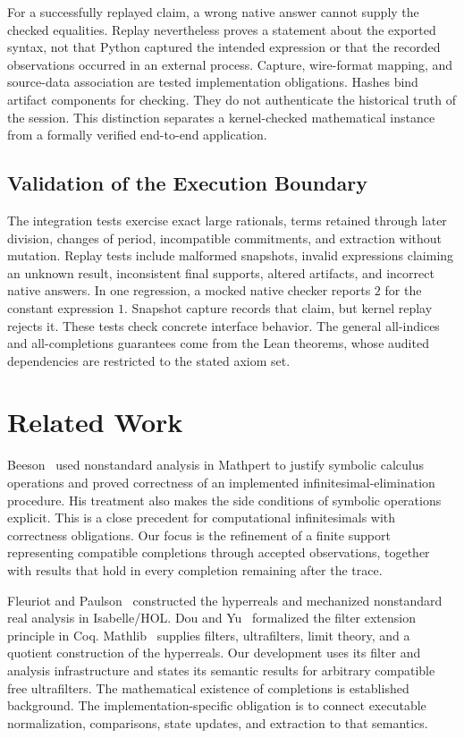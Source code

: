 \documentclass[11pt,a4paper]{article}
\theoremstyle{result}
\theoremstyle{definition}
\begin{document}
For a successfully replayed claim, a wrong native answer cannot supply the checked equalities. Replay nevertheless proves a statement about the exported syntax, not that Python captured the intended expression or that the recorded observations occurred in an external process. Capture, wire-format mapping, and source-data association are tested implementation obligations. Hashes bind artifact components for checking. They do not authenticate the historical truth of the session. This distinction separates a kernel-checked mathematical instance from a formally verified end-to-end application.

\subsection{Validation of the Execution Boundary}

The integration tests exercise exact large rationals, terms retained through later division, changes of period, incompatible commitments, and extraction without mutation. Replay tests include malformed snapshots, invalid expressions claiming an unknown result, inconsistent final supports, altered artifacts, and incorrect native answers. In one regression, a mocked native checker reports $2$ for the constant expression $1$. Snapshot capture records that claim, but kernel replay rejects it. These tests check concrete interface behavior. The general all-indices and all-completions guarantees come from the Lean theorems, whose audited dependencies are restricted to the stated axiom set.

\section{Related Work}\label{sec:related}

Beeson~\cite{Beeson1995} used nonstandard analysis in Mathpert to justify symbolic calculus operations and proved correctness of an implemented infinitesimal-elimination procedure. His treatment also makes the side conditions of symbolic operations explicit. This is a close precedent for computational infinitesimals with correctness obligations. Our focus is the refinement of a finite support representing compatible completions through accepted observations, together with results that hold in every completion remaining after the trace.

Fleuriot and Paulson~\cite{FleuriotPaulson2000} constructed the hyperreals and mechanized nonstandard real analysis in Isabelle/HOL. Dou and Yu~\cite{DouYu2024} formalized the filter extension principle in Coq. Mathlib~\cite{mathlib2020} supplies filters, ultrafilters, limit theory, and a quotient construction of the hyperreals. Our development uses its filter and analysis infrastructure and states its semantic results for arbitrary compatible free ultrafilters. The mathematical existence of completions is established background. The implementation-specific obligation is to connect executable normalization, comparisons, state updates, and extraction to that semantics.
\end{document}
